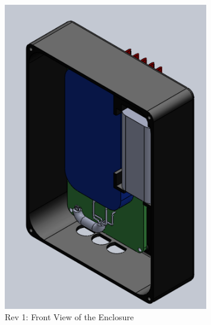 \documentclass{article}
\numberwithin{figure}{section}
\numberwithin{equation}{section}
\begin{document}
{\begin{figure}[H]
	\centering
	\includegraphics[width=0.8\textwidth]{Assembly2}
	\caption{Rev 1: Front View of the Enclosure}
	\label{fig:append_enclosurefront}
\end{figure}

}
\end{document}
